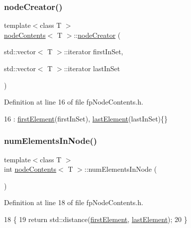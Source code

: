 \subsubsection{\texorpdfstring{node\+Creator()}{nodeCreator()}}
{\footnotesize\ttfamily template$<$class T $>$ \\
\hyperlink{classnodeContents}{node\+Contents}$<$ T $>$\+::\hyperlink{classnodeCreator}{node\+Creator} (\begin{DoxyParamCaption}\item[{std\+::vector$<$ T $>$\+::iterator}]{first\+In\+Set,  }\item[{std\+::vector$<$ T $>$\+::iterator}]{last\+In\+Set }\end{DoxyParamCaption})\hspace{0.3cm}{\ttfamily [inline]}}



Definition at line 16 of file fp\+Node\+Contents.\+h.


\begin{DoxyCode}
16 : \hyperlink{classnodeContents_ae9259755596d9e4542ad73605112569f}{firstElement}(firstInSet), \hyperlink{classnodeContents_addfed5d7004d0d126856cd5907e11ff3}{lastElement}(lastInSet)\{\}
\end{DoxyCode}
\mbox{\label{classnodeContents_a161b1ff6370efdb429ef3e5afe7623c2}} 
\subsubsection{\texorpdfstring{num\+Elements\+In\+Node()}{numElementsInNode()}}
{\footnotesize\ttfamily template$<$class T $>$ \\
int \hyperlink{classnodeContents}{node\+Contents}$<$ T $>$\+::num\+Elements\+In\+Node (\begin{DoxyParamCaption}{ }\end{DoxyParamCaption})\hspace{0.3cm}{\ttfamily [inline]}}



Definition at line 18 of file fp\+Node\+Contents.\+h.


\begin{DoxyCode}
18                                       \{
19 \textcolor{keywordflow}{return} std::distance(\hyperlink{classnodeContents_ae9259755596d9e4542ad73605112569f}{firstElement}, \hyperlink{classnodeContents_addfed5d7004d0d126856cd5907e11ff3}{lastElement});
20         \}
\end{DoxyCode}


